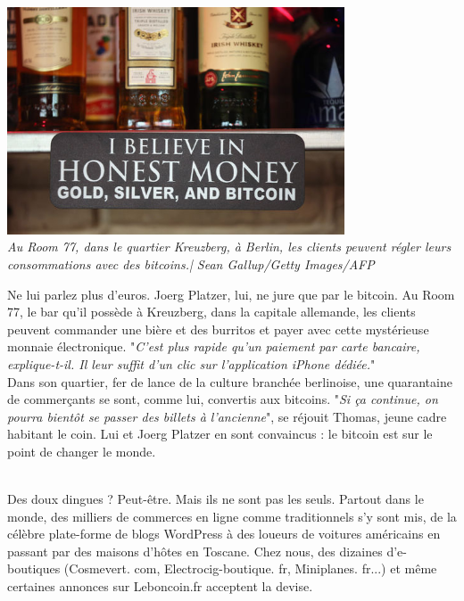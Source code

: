 \documentclass[11pt,twoside,a4paper]{article}
\begin{document}
\begin{minipage}[ht]{10.25cm}
	\includegraphics[width=10.00cm]{img/3481688_6_af19_au-room-77-dans-le-quartier-kreuzberg-a_817c1632a0fcd91dda95a5df6039a5ed.jpg} ~\\
	\emph{Au Room 77, dans le quartier Kreuzberg, {\`a} Berlin, les clients peuvent r{\'e}gler leurs consommations avec des bitcoins.| Sean Gallup/Getty Images/AFP}~\\
\end{minipage} \hfill \begin{minipage}[ht]{9.00cm}
	Ne lui parlez plus d'euros. Joerg Platzer, lui, ne jure que par le bitcoin. Au Room 77, le bar qu'il poss{\`e}de {\`a} Kreuzberg, dans la capitale allemande, les clients peuvent commander une bi{\`e}re et des burritos et payer avec cette myst{\'e}rieuse monnaie {\'e}lectronique. "\emph{C'est plus rapide qu'un paiement par carte bancaire, explique-t-il. Il leur suffit d'un clic sur l'application iPhone d{\'e}di{\'e}e.}" ~\\
	
	Dans son quartier, fer de lance de la culture branch{\'e}e berlinoise, une quarantaine de commer\c{c}ants se sont, comme lui, convertis aux bitcoins. "\emph{Si \c{c}a continue, on pourra bient{\^o}t se passer des billets {\`a} l'ancienne}", se r{\'e}jouit Thomas, jeune cadre habitant le coin. Lui et Joerg Platzer en sont convaincus : le bitcoin est sur le point de changer le monde. ~\\
\end{minipage}~\\

Des doux dingues ? Peut-{\^e}tre. Mais ils ne sont pas les seuls. Partout dans le monde, des milliers de commerces en ligne comme traditionnels s'y sont mis, de la c{\'e}l{\`e}bre plate-forme de blogs WordPress {\`a} des loueurs de voitures am{\'e}ricains en passant par des maisons d'h{\^o}tes en Toscane. Chez nous, des dizaines d'e-boutiques (Cosmevert. com, Electrocig-boutique. fr, Miniplanes. fr...) et m{\^e}me certaines annonces sur Leboncoin.fr acceptent la devise. ~\\
\end{document}
